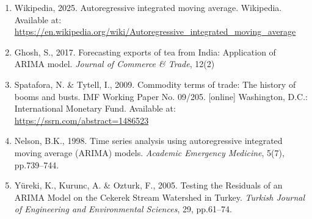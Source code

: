 \documentclass[12pt,a4paper]{report} %
\begin{document}
\begin{enumerate}
		\item Wikipedia, 2025. Autoregressive integrated moving average. Wikipedia. Available at: \url{https://en.wikipedia.org/wiki/Autoregressive_integrated_moving_average}
		
		\item Ghosh, S., 2017. Forecasting exports of tea from India: Application of ARIMA model. \textit{Journal of Commerce \& Trade}, 12(2)
		
		\item Spatafora, N. \& Tytell, I., 2009. Commodity terms of trade: The history of booms and busts. IMF Working Paper No. 09/205. [online] Washington, D.C.: International Monetary Fund. Available at: \url{https://ssrn.com/abstract=1486523}
		
		\item Nelson, B.K., 1998. Time series analysis using autoregressive integrated moving average (ARIMA) models. \textit{Academic Emergency Medicine}, 5(7), pp.739--744.
		
		\item Yüreki, K., Kurunc, A. \& Ozturk, F., 2005. Testing the Residuals of an ARIMA Model on the Cekerek Stream Watershed in Turkey. \textit{Turkish Journal of Engineering and Environmental Sciences}, 29, pp.61--74.
	\end{enumerate}
	 
	
		
	
\end{document}
